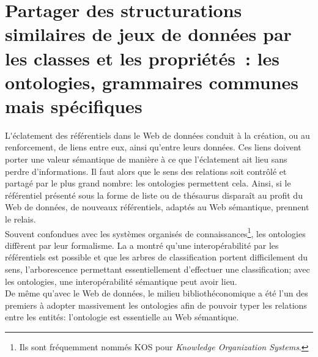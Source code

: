 \chapter{\label{II-B}Partager des structurations similaires de jeux de données par les classes et les propriétés : les ontologies, grammaires communes mais spécifiques}

\lettrine{L}'éclatement des référentiels dans le Web de données conduit à la création, ou au renforcement, de liens entre eux, ainsi qu'entre leurs données. Ces liens doivent porter une valeur sémantique de manière à ce que l'éclatement ait lieu sans perdre d'informations. Il faut alors que le sens des relations soit contrôlé et partagé par le plus grand nombre: les ontologies permettent cela. Ainsi, si le référentiel présenté sous la forme de liste ou de thésaurus disparaît au profit du Web de données, de nouveaux référentiels, adaptés au Web sémantique, prennent le relais.\\

Souvent confondues avec les systèmes organisés de connaissances\footnote{Ils sont fréquemment nommés KOS pour \textit{Knowledge Organization Systems}.}, les ontologies diffèrent par leur formalisme. La  a montré qu'une interopérabilité par les référentiels est possible et que les arbres de classification portent difficilement du sens, l'arborescence permettant essentiellement d'effectuer une classification; avec les ontologies, une interopérabilité sémantique peut avoir lieu.\\

De même qu'avec le Web de données, le milieu bibliothéconomique a été l'un des premiers à adopter massivement les ontologies afin de pouvoir typer les relations entre les entités: l'ontologie est essentielle au Web sémantique.\\





